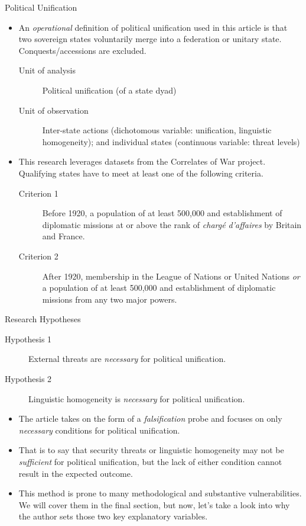 \documentclass{beamer}
\begin{document}
	\begin{frame}{Political Unification}
		\begin{itemize}
			\item An \textit{operational} definition of political unification used in this article is that two sovereign states voluntarily merge into a federation or unitary state. Conquests/accessions are excluded.
			\begin{description}
				\item[Unit of analysis] Political unification (of a state dyad)
				\item[Unit of observation] Inter-state actions (dichotomous variable: unification, linguistic homogeneity); and individual states (continuous variable: threat levels)
			\end{description}
		\end{itemize}

		\begin{itemize}
			\item This research leverages datasets from the Correlates of War project. Qualifying states have to meet at least one of the following criteria.
			\begin{description}
				\item[Criterion 1] Before 1920, a population of at least 500,000 and establishment of diplomatic missions at or above the rank of \textit{chargé d'affaires} by Britain and France.
				\item[Criterion 2] After 1920, membership in the League of Nations or United Nations \textit{or} a population of at least 500,000 and establishment of diplomatic missions from any two major powers.
			\end{description}
		\end{itemize}
	\end{frame}

	\begin{frame}{Research Hypotheses}
		\begin{description}
			\item[Hypothesis 1] External threats are \textit{necessary} for political unification.
			\item[Hypothesis 2] Linguistic homogeneity is \textit{necessary} for political unification.
		\end{description}
		\begin{itemize}
			\item The article takes on the form of a \textit{falsification} probe and focuses on only \textit{necessary} conditions for political unification.
			\item That is to say that security threats or linguistic homogeneity may not be \textit{sufficient} for political unification, but the lack of either condition cannot result in the expected outcome.
			\item This method is prone to many methodological and substantive vulnerabilities. We will cover them in the final section, but now, let's take a look into why the author sets those two key explanatory variables.
		\end{itemize}
	\end{frame}
\end{document}
